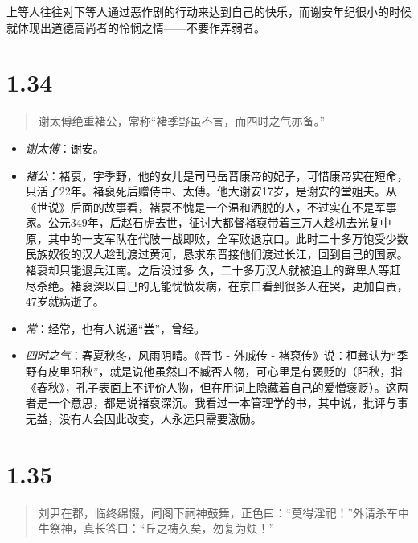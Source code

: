 \documentclass[]{book}
\providecommand{\tightlist}{%
  \setlength{\itemsep}{0pt}\setlength{\parskip}{0pt}}
\begin{document}
上等人往往对下等人通过恶作剧的行动来达到自己的快乐，而谢安年纪很小的时候就体现出道德高尚者的怜悯之情------不要作弄弱者。

\section{1.34}\label{section-33}

\begin{quote}
谢太傅绝重褚公，常称``褚季野虽不言，而四时之气亦备。''
\end{quote}

\begin{itemize}
\tightlist
\item
  \emph{谢太傅}：谢安。
\item
  \emph{褚公}：褚裒，字季野，他的女儿是司马岳晋康帝的妃子，可惜康帝实在短命，只活了22年。褚裒死后赠侍中、太傅。他大谢安17岁，是谢安的堂姐夫。从《世说》后面的故事看，褚裒不愧是一个温和洒脱的人，不过实在不是军事家。公元349年，后赵石虎去世，征讨大都督褚裒带着三万人趁机去光复中原，其中的一支军队在代陂一战即败，全军败退京口。此时二十多万饱受少数民族奴役的汉人趁乱渡过黄河，恳求东晋接他们渡过长江，回到自己的国家。褚裒却只能退兵江南。之后没过多
  久，二十多万汉人就被追上的鲜卑人等赶尽杀绝。褚裒深以自己的无能忧愤发病，在京口看到很多人在哭，更加自责，47岁就病逝了。
\item
  \emph{常}：经常，也有人说通``尝''，曾经。
\item
  \emph{四时之气}：春夏秋冬，风雨阴晴。《晋书 - 外戚传 -
  褚裒传》说：桓彝认为``季野有皮里阳秋''，就是说他虽然口不臧否人物，可心里是有褒贬的（阳秋，指《春秋》，孔子表面上不评价人物，但在用词上隐藏着自己的爱憎褒贬）。这两者是一个意思，都是说褚裒深沉。我看过一本管理学的书，其中说，批评与事无益，没有人会因此改变，人永远只需要激励。
\end{itemize}

\section{1.35}\label{section-34}

\begin{quote}
刘尹在郡，临终绵惙，闻阁下祠神鼓舞，正色曰：``莫得淫祀！''外请杀车中牛祭神，真长答曰：``丘之祷久矣，勿复为烦！''
\end{quote}
\end{document}
